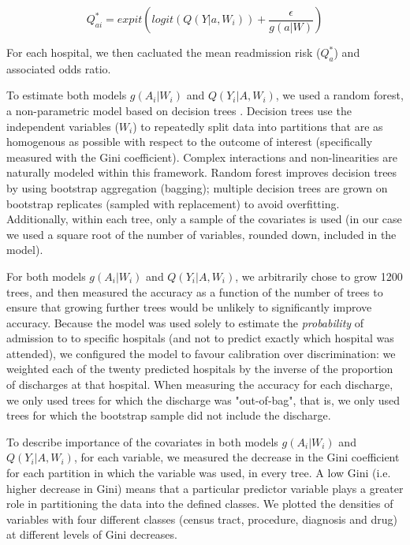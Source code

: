 \documentclass[]{article}\usepackage[]{graphicx}\usepackage[]{color}
\begin{document}
\begin{equation}
\label{Q_star_logistic}
Q^*_{ai}= expit(logit(Q(Y|a,W_i)) + \frac{\epsilon}{g(a|W)})
\end{equation}

For each hospital, we then cacluated the mean readmission risk ($Q^*_a$) and associated odds ratio.

To estimate both models $g(A_i|W_i)$ and $Q(Y_i|A,W_i)$, we used a random forest, a non-parametric model based on decision trees \supercite{breiman_random_2001}. Decision trees use the independent variables ($W_i$) to repeatedly split data into partitions that are as homogenous as possible with respect to the outcome of interest (specifically measured with the Gini coefficient\supercite{gini_variabilita_1912}). Complex interactions and non-linearities are naturally modeled within this framework. Random forest improves decision trees by using bootstrap aggregation (bagging); multiple decision trees are grown on bootstrap replicates (sampled with replacement) to avoid overfitting. Additionally, within each tree, only a sample of the covariates is used (in our case we used a square root of the number of variables, rounded down, included in the model).

For both models $g(A_i|W_i)$ and $Q(Y_i|A,W_i)$, we arbitrarily chose to grow 1200 trees, and then measured the accuracy as a function of the number of trees to ensure that growing further trees would be unlikely to significantly improve accuracy. Because the model was used solely to estimate the \emph{probability} of admission to to specific hospitals (and not to predict exactly which hospital was attended), we configured the model to favour calibration over discrimination: we weighted each of the twenty predicted hospitals by the inverse of the proportion of discharges at that hospital. When measuring the accuracy for each discharge, we only used trees for which the discharge was "out-of-bag", that is, we only used trees for which the bootstrap sample did not include the discharge.

To describe importance of the covariates in both models $g(A_i|W_i)$ and $Q(Y_i|A,W_i)$, for each variable, we measured the decrease in the Gini coefficient for each partition in which the variable was used, in every tree. A low Gini (i.e. higher decrease in Gini) means that a particular predictor variable plays a greater role in partitioning the data into the defined classes. We plotted the densities of variables with four different classes (census tract, procedure, diagnosis and drug) at different levels of Gini decreases.
\end{document}
